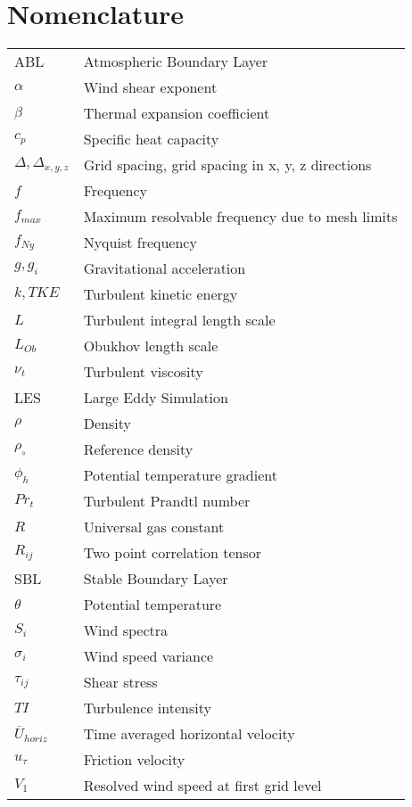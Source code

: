 \documentclass[conf]{new-aiaa}
\begin{document}
\section{Nomenclature}
{\renewcommand\arraystretch{1.0}
  \noindent\begin{longtable*}{@{}l @{\quad=\quad} l@{}}
ABL       & Atmospheric Boundary Layer \\
$\alpha$  & Wind shear exponent  \\
$\beta$   & Thermal expansion coefficient \\
$c_p$     & Specific heat capacity \\
$\Delta, \Delta_{x,y,z}$  & Grid spacing, grid spacing in x, y, z directions \\
$f$       & Frequency \\
$f_{max}$  & Maximum resolvable frequency due to mesh limits \\
$f_{Ny}$   & Nyquist frequency \\
$g, g_i$   & Gravitational acceleration \\
$k, TKE$  & Turbulent kinetic energy \\
$L$       & Turbulent integral length scale \\
$L_{Ob}$   & Obukhov length scale \\
$\nu_t$   & Turbulent viscosity \\
LES       & Large Eddy Simulation \\
$\rho$    & Density \\
$\rho_\circ$ & Reference density  \\
$\phi_h$  & Potential temperature gradient \\
$Pr_t$    & Turbulent Prandtl number \\
$R$       & Universal gas constant \\
$R_{ij}$   & Two point correlation tensor \\
SBL       & Stable Boundary Layer \\
$\theta$  & Potential temperature \\
$S_i$     & Wind spectra \\
$\sigma_i$ & Wind speed variance \\
$\tau_{ij}$ & Shear stress \\
$TI$      & Turbulence intensity \\
$\overline{U}_{horiz}$ & Time averaged horizontal velocity \\
$u_\tau$   & Friction velocity    \\
$V_1$     & Resolved wind speed at first grid level 
\end{longtable*}}
\end{document}
